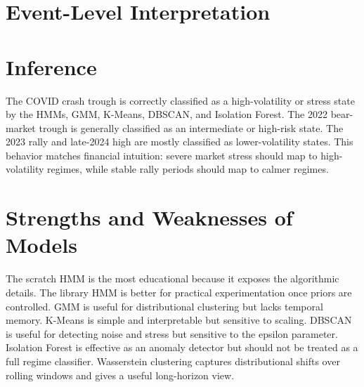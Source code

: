 \documentclass[12pt,a4paper]{report}
\begin{document}
\section{Event-Level Interpretation}
\begin{table}[H]
\centering
\caption{Model states around major observed market events.}
\tiny
{}
\end{table}

\section{Inference}
The COVID crash trough is correctly classified as a high-volatility or stress state by the HMMs, GMM, K-Means, DBSCAN, and Isolation Forest. The 2022 bear-market trough is generally classified as an intermediate or high-risk state. The 2023 rally and late-2024 high are mostly classified as lower-volatility states. This behavior matches financial intuition: severe market stress should map to high-volatility regimes, while stable rally periods should map to calmer regimes.

\section{Strengths and Weaknesses of Models}
The scratch HMM is the most educational because it exposes the algorithmic details. The library HMM is better for practical experimentation once priors are controlled. GMM is useful for distributional clustering but lacks temporal memory. K-Means is simple and interpretable but sensitive to scaling. DBSCAN is useful for detecting noise and stress but sensitive to the epsilon parameter. Isolation Forest is effective as an anomaly detector but should not be treated as a full regime classifier. Wasserstein clustering captures distributional shifts over rolling windows and gives a useful long-horizon view.
\end{document}
